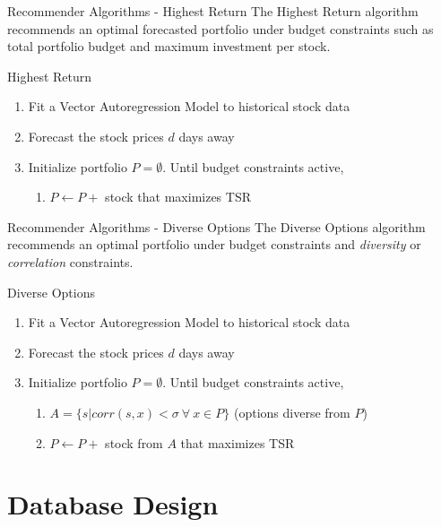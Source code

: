 \documentclass{beamer}
\begin{document}
\begin{frame}{Recommender Algorithms - Highest Return}
The Highest Return algorithm recommends an optimal forecasted portfolio under budget constraints such as total portfolio budget and maximum investment per stock.

\begin{block}{Highest Return}
\begin{enumerate}
	\item Fit a Vector Autoregression Model to historical stock data
	\item Forecast the stock prices $d$ days away
	\item Initialize portfolio $P = \emptyset$. Until budget constraints active,
		\begin{enumerate}
			\item $P \leftarrow P +$ stock that maximizes TSR
		\end{enumerate}
\end{enumerate}
\end{block}

\end{frame}

\begin{frame}{Recommender Algorithms - Diverse Options}
The Diverse Options algorithm recommends an optimal portfolio under budget constraints and \emph{diversity} or \emph{correlation} constraints.

\begin{block}{Diverse Options}
\begin{enumerate}
	\item Fit a Vector Autoregression Model to historical stock data
	\item Forecast the stock prices $d$ days away
	\item Initialize portfolio $P = \emptyset$. Until budget constraints active,
		\begin{enumerate}
			\item $A = \{s | corr(s,x) < \sigma \ \forall \ x \in P\}$ (options diverse from $P$)
			\item $P \leftarrow P +$ stock from $A$ that maximizes TSR
		\end{enumerate}
\end{enumerate}
\end{block}

\end{frame}

\section{Database Design}
\end{document}
